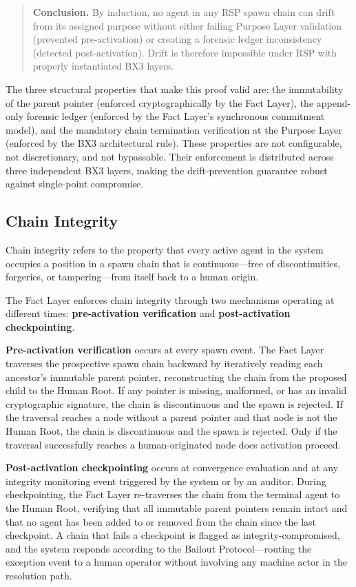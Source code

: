 \begin{quotation}
\textbf{Conclusion.} By induction, no agent in any RSP spawn chain can drift from its assigned purpose without either failing Purpose Layer validation (prevented pre-activation) or creating a forensic ledger inconsistency (detected post-activation). Drift is therefore impossible under RSP with properly instantiated BX3 layers.
\end{quotation}

The three structural properties that make this proof valid are: the immutability of the parent pointer (enforced cryptographically by the Fact Layer), the append-only forensic ledger (enforced by the Fact Layer's synchronous commitment model), and the mandatory chain termination verification at the Purpose Layer (enforced by the BX3 architectural rule). These properties are not configurable, not discretionary, and not bypassable. Their enforcement is distributed across three independent BX3 layers, making the drift-prevention guarantee robust against single-point compromise.

\subsection{Chain Integrity}

Chain integrity refers to the property that every active agent in the system occupies a position in a spawn chain that is continuous—free of discontinuities, forgeries, or tampering—from itself back to a human origin.

The Fact Layer enforces chain integrity through two mechanisms operating at different times: \textbf{pre-activation verification} and \textbf{post-activation checkpointing}.

\textbf{Pre-activation verification} occurs at every spawn event. The Fact Layer traverses the prospective spawn chain backward by iteratively reading each ancestor's immutable parent pointer, reconstructing the chain from the proposed child to the Human Root. If any pointer is missing, malformed, or has an invalid cryptographic signature, the chain is discontinuous and the spawn is rejected. If the traversal reaches a node without a parent pointer and that node is not the Human Root, the chain is discontinuous and the spawn is rejected. Only if the traversal successfully reaches a human-originated node does activation proceed.

\textbf{Post-activation checkpointing} occurs at convergence evaluation and at any integrity monitoring event triggered by the system or by an auditor. During checkpointing, the Fact Layer re-traverses the chain from the terminal agent to the Human Root, verifying that all immutable parent pointers remain intact and that no agent has been added to or removed from the chain since the last checkpoint. A chain that fails a checkpoint is flagged as integrity-compromised, and the system responds according to the Bailout Protocol—routing the exception event to a human operator without involving any machine actor in the resolution path.

